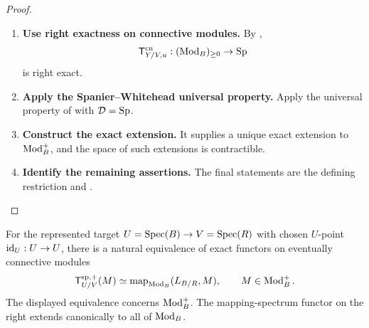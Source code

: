 \begin{proof}
\leavevmode
\begin{enumerate}[label=\textup{(\arabic*)}]
    \item \textbf{Use right exactness on connective modules.}
    By ,
    \[
        \mathsf T^{\mathrm{cn}}_{Y/V,u}:
        (\operatorname{Mod}_B)_{\geq0}\to\operatorname{Sp}
    \]
    is right exact.
    \item \textbf{Apply the Spanier--Whitehead universal property.}
    Apply the universal property of
     with
    \(\mathcal D=\operatorname{Sp}\).
    \item \textbf{Construct the exact extension.}
    It supplies a unique exact extension to
    \(\operatorname{Mod}_B^+\), and the space of such extensions is contractible.
    \item \textbf{Identify the remaining assertions.}
    The final
    statements are the defining restriction and
    .
\end{enumerate}
\end{proof}

\begin{proposition}
\label{prop:represented-tangent-cotangent}
For the represented target \(U=\operatorname{Spec}(B)\to V=\operatorname{Spec}(R)\) with chosen
\(U\)-point \(\operatorname{id}_U:U\to U\), there is a natural equivalence of exact functors on eventually
connective modules
\[
    \mathsf T^{\mathrm{sp},+}_{U/V}(M)
    \simeq
    \operatorname{map}_{\operatorname{Mod}_B}(L_{B/R},M),
    \qquad
    M\in\operatorname{Mod}_B^+.
\]
The displayed equivalence concerns \(\operatorname{Mod}_B^+\). The mapping-spectrum
functor on the right extends canonically to all of \(\operatorname{Mod}_B\).
\end{proposition}

